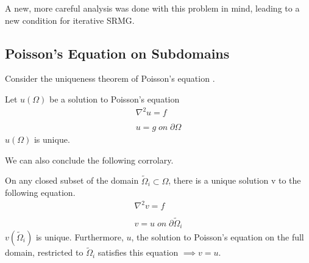 \documentclass[final]{siamart1116}
\numberwithin{theorem}{section}
\begin{document}
A new, more careful analysis was done with this problem in mind, leading to a new condition for iterative SRMG.



\subsection{Poisson's Equation on Subdomains}

Consider the uniqueness theorem of Poisson's equation \cite{poissonunique}.

\begin{theorem}
Let $u(\Omega)$ be a solution to Poisson's equation
\begin{align*} 
\nabla^2 u = f\\
\\ u = g \; on \; \partial \Omega 
\end{align*}
$u(\Omega)$ is unique. 
\end{theorem}

 We can also conclude the following corrolary. 

\begin{corollary}
\label{corollaryunique}
On any closed subset of the domain $\tilde{\Omega}_i \subset \Omega$, there is a unique solution v to the following equation. 
\begin{align*} 
\nabla^2 v = f\\
\\ v = u \; on \; \partial \tilde{\Omega}_i 
\end{align*}
$v(\tilde{\Omega}_i)$ is unique. 
Furthermore, $u$, the solution to Poisson's equation on the full domain, restricted to $\tilde{\Omega}_i$ satisfies this equation $\implies v = u$. 
\end{corollary}



\end{document}
